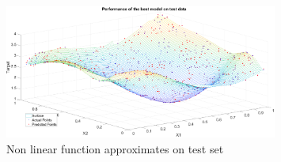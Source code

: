 \begin{figure}[!htpb]
	\centering
	\captionsetup{format = hang}
	\includegraphics[width = 0.8\textwidth]{Exercise1/Report/test_out}
	\caption{Non linear function approximates on test set} \label{fig:test_out}
\end{figure}

